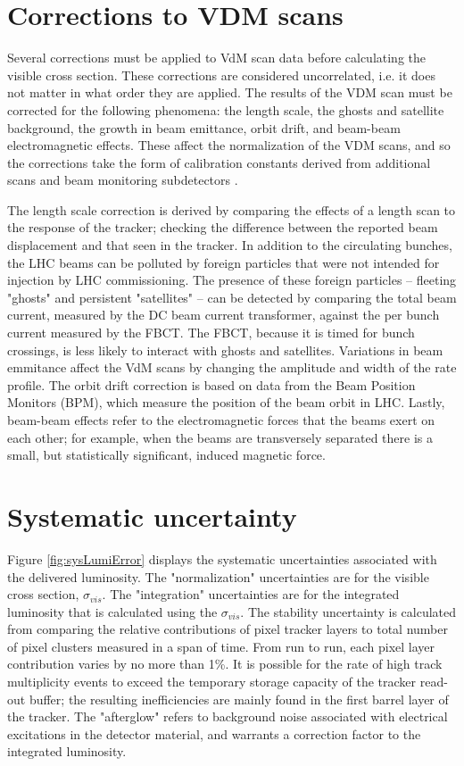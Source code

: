 \section{Corrections to VDM scans}

Several corrections must be applied to VdM scan data before calculating the visible cross section. These corrections are considered uncorrelated, i.e. it does not matter in what order they are applied. The results of the VDM scan must be corrected for the following phenomena: the length scale, the ghosts and satellite background, the growth in beam emittance, orbit drift, and beam-beam electromagnetic effects. These affect the normalization of the VDM scans, and so the corrections take the form of calibration constants derived from additional scans and beam monitoring subdetectors \cite{CMS:2013gfa}. 

The length scale correction is derived by comparing the effects of a length scan to the response of the tracker; checking the difference between the reported beam displacement and that seen in the tracker. In addition to the circulating bunches, the LHC beams can be polluted by foreign particles that were not intended for injection by LHC commissioning. The presence of these foreign particles -- fleeting "ghosts" and persistent "satellites" -- can be detected by comparing the total beam current, measured by the DC beam current transformer, against the per bunch current measured by the FBCT. The FBCT, because it is timed for bunch crossings, is less likely to interact with ghosts and satellites. Variations in beam emmitance affect the VdM scans by changing the amplitude and width of the rate profile. The orbit drift correction is based on data from the Beam Position Monitors (BPM), which measure the position of the beam orbit in LHC. Lastly, beam-beam effects refer to the electromagnetic forces that the beams exert on each other; for example, when the beams are transversely separated there is a small, but statistically significant, induced magnetic force. 

\section{Systematic uncertainty}

Figure \ref{fig:sysLumiError} displays the systematic uncertainties associated with the delivered luminosity. The "normalization" uncertainties are for the visible cross section, $\sigma_{vis}$. The "integration" uncertainties are for the integrated luminosity that is calculated using the $\sigma_{vis}$. The stability uncertainty is calculated from comparing the relative contributions of pixel tracker layers to total number of pixel clusters measured in a span of time. From run to run, each pixel layer contribution varies by no more than 1\%. It is possible for the rate of high track multiplicity events to exceed the temporary storage capacity of the tracker read-out buffer; the resulting inefficiencies are mainly found in the first barrel layer of the tracker. The "afterglow" refers to background noise associated with electrical excitations in the detector material, and warrants a correction factor to the integrated luminosity. 

